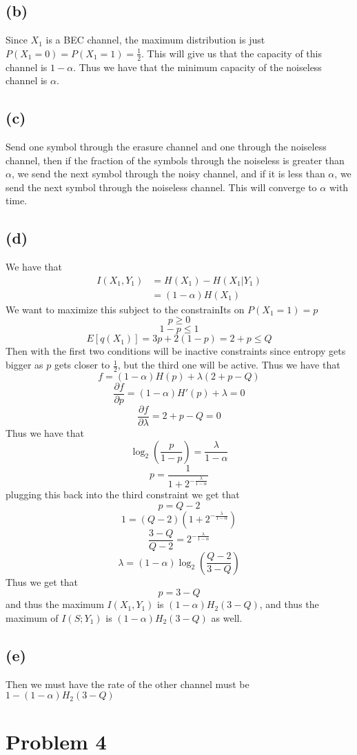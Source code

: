 \subsection*{(b)}
Since $X_1$ is a BEC channel, the maximum
distribution is just $P(X_1=0)=P(X_1=1)=\frac{1}{2}$. 
This will give us that the capacity of this channel is 
$1-\alpha$. Thus we have that the minimum capacity
of the noiseless channel is $\alpha$.
\subsection*{(c)}
Send one symbol through the
erasure channel and one through the noiseless channel, 
then if the fraction of the symbols through the 
noiseless is greater than $\alpha$, we send the next
symbol through the noisy channel, and if it 
is less than $\alpha$, we send the next symbol
through the noiseless channel. This will
converge to $\alpha$ with time.
\subsection*{(d)}
We have that
\begin{align*}
    I(X_1,Y_1)&=H(X_1)-H(X_1|Y_1)\\
    &=(1-\alpha)H(X_1)
\end{align*}
We want to maximize this subject
to the constrainIts on $P(X_1=1)=p$
$$p\geq 0$$
$$1-p\leq 1$$
$$E[q(X_1)]=3p+2(1-p)=2+p\leq Q$$
Then with the first two conditions will be inactive constraints
since entropy gets bigger as $p$ gets closer to $\frac{1}{2}$,
but the third one will be active. Thus we have that
$$f=(1-\alpha)H(p)+\lambda (2+p-Q)$$
$$\frac{\partial f}{\partial p}=(1-\alpha)H'(p)+\lambda=0$$
$$\frac{\partial f}{\partial \lambda}=2+p-Q=0$$
Thus we have that
$$\log_2\left(\frac{p}{1-p}\right)=\frac{\lambda}{1-\alpha}$$
$$p=\frac{1}{1+2^{-\frac{\lambda}{1-\alpha}}}$$
plugging this back into the third constraint we get that
$$p=Q-2$$
$$1=(Q-2)(1+2^{-\frac{\lambda}{1-\alpha}})$$
$$\frac{3-Q}{Q-2}=2^{-\frac{\lambda}{1-\alpha}}$$
$$\lambda=(1-\alpha)\log_2\left(\frac{Q-2}{3-Q}\right)$$
Thus we get that
$$p=3-Q$$
and thus the maximum $I(X_1,Y_1)$ is $(1-\alpha)H_2(3-Q)$, 
and thus the maximum of $I(S;Y_1)$ is $\boxed{(1-\alpha)H_2(3-Q)}$
as well.
\subsection*{(e)}
Then we must have the rate of 
the other channel must be $1-(1-\alpha)H_2(3-Q)$
\section*{Problem 4}
